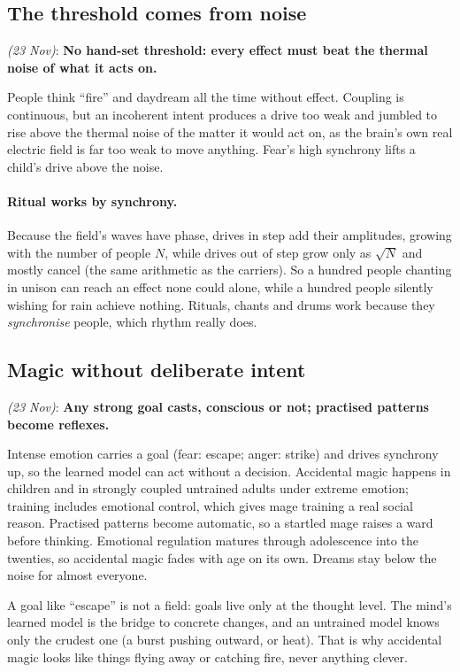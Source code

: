\documentclass[11pt,a4paper]{article}
\newcommand{\decision}[3]{\par\smallskip\noindent{\color{dec}\textbf{Decision #1}} \textit{(#2)}: \textbf{#3}\par}
\begin{document}
\subsection{The threshold comes from noise}

\decision{Q3.3}{23 Nov}{No hand-set threshold: every effect must beat the thermal noise of what it acts on.}

People think ``fire'' and daydream all the time without effect. Coupling is continuous, but an incoherent intent produces a drive too weak and jumbled to rise above the thermal noise of the matter it would act on, as the brain's own real electric field is far too weak to move anything. Fear's high synchrony lifts a child's drive above the noise.

\paragraph{Ritual works by synchrony.} Because the field's waves have phase, drives in step add their amplitudes, growing with the number of people $N$, while drives out of step grow only as $\sqrt N$ and mostly cancel (the same arithmetic as the carriers). So a hundred people chanting in unison can reach an effect none could alone, while a hundred people silently wishing for rain achieve nothing. Rituals, chants and drums work because they \emph{synchronise} people, which rhythm really does.

\subsection{Magic without deliberate intent}

\decision{Q3.4}{23 Nov}{Any strong goal casts, conscious or not; practised patterns become reflexes.}

Intense emotion carries a goal (fear: escape; anger: strike) and drives synchrony up, so the learned model can act without a decision. Accidental magic happens in children and in strongly coupled untrained adults under extreme emotion; training includes emotional control, which gives mage training a real social reason. Practised patterns become automatic, so a startled mage raises a ward before thinking. Emotional regulation matures through adolescence into the twenties, so accidental magic fades with age on its own. Dreams stay below the noise for almost everyone.

A goal like ``escape'' is not a field: goals live only at the thought level. The mind's learned model is the bridge to concrete changes, and an untrained model knows only the crudest one (a burst pushing outward, or heat). That is why accidental magic looks like things flying away or catching fire, never anything clever.
\end{document}
